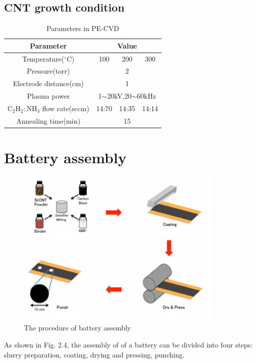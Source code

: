\subsection{CNT growth condition}
\begin{table}[H]
\centering
\caption{Parameters in PE-CVD}
\begin{tabular}{cccc}
\toprule
Parameter          & \multicolumn{3}{c}{Value}                     \\
\midrule
Temperature(\(^\circ\)C)        & 100            & 200           & 300          \\
Pressure(torr)           & \multicolumn{3}{c}{2}                         \\
Electrode distance(cm) & \multicolumn{3}{c}{1}                         \\
Plasma power       & \multicolumn{3}{c}{1$\sim$20kV,20$\sim$60kHz} \\
$\mathrm{C_{2}H_{2}:NH_{3}}$ flow rate(sccm)           & 14:70          & 14:35         & 14:14        \\
Annealing time(min)     & \multicolumn{3}{c}{15}    \\                 \bottomrule  
\end{tabular}
\end{table}

\newpage

\section{Battery assembly}
\begin{figure}[H]
\centering
\includegraphics[width=10cm]{src/fig/fig23.png}
\caption{The procedure of battery assembly}
\end{figure}
As shown in Fig. 2.4, the assembly of of a battery can be divided into four steps: slurry preparation, coating, drying and pressing, punching.
